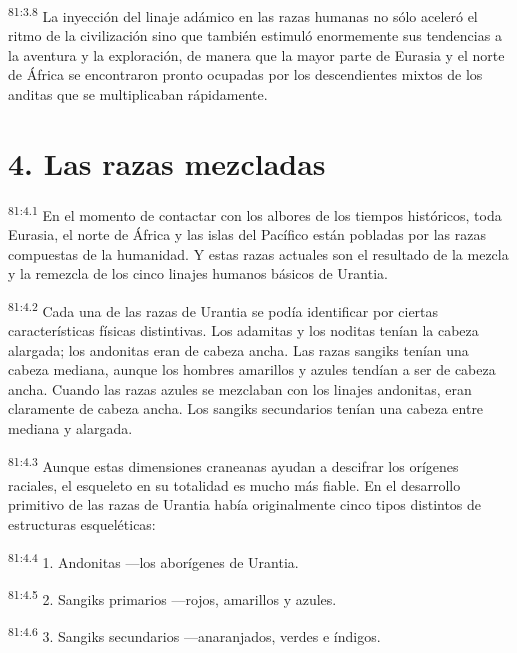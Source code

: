\documentclass[twoside, 11pt]{book}
\begin{document}
\par
\textsuperscript{81:3.8} La inyección del linaje adámico en las razas humanas no sólo aceleró el ritmo de la civilización sino que también estimuló enormemente sus tendencias a la aventura y la exploración, de manera que la mayor parte de Eurasia y el norte de África se encontraron pronto ocupadas por los descendientes mixtos de los anditas que se multiplicaban rápidamente.

\section*{4. Las razas mezcladas}
\par
\textsuperscript{81:4.1} En el momento de contactar con los albores de los tiempos históricos, toda Eurasia, el norte de África y las islas del Pacífico están pobladas por las razas compuestas de la humanidad. Y estas razas actuales son el resultado de la mezcla y la remezcla de los cinco linajes humanos básicos de Urantia.

\par
\textsuperscript{81:4.2} Cada una de las razas de Urantia se podía identificar por ciertas características físicas distintivas. Los adamitas y los noditas tenían la cabeza alargada; los andonitas eran de cabeza ancha. Las razas sangiks tenían una cabeza mediana, aunque los hombres amarillos y azules tendían a ser de cabeza ancha. Cuando las razas azules se mezclaban con los linajes andonitas, eran claramente de cabeza ancha. Los sangiks secundarios tenían una cabeza entre mediana y alargada.

\par
\textsuperscript{81:4.3} Aunque estas dimensiones craneanas ayudan a descifrar los orígenes raciales, el esqueleto en su totalidad es mucho más fiable. En el desarrollo primitivo de las razas de Urantia había originalmente cinco tipos distintos de estructuras esqueléticas:

\par
\textsuperscript{81:4.4} 1. Andonitas ---los aborígenes de Urantia.

\par
\textsuperscript{81:4.5} 2. Sangiks primarios ---rojos, amarillos y azules.

\par
\textsuperscript{81:4.6} 3. Sangiks secundarios ---anaranjados, verdes e índigos.
\end{document}
